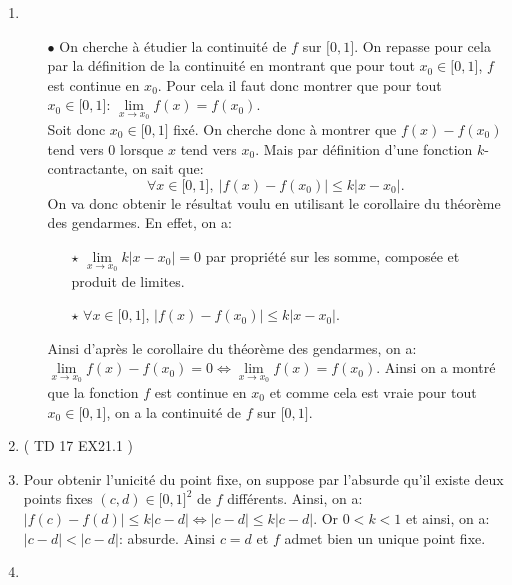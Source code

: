 \documentclass[a4paper, 11pt,reqno]{article}
\begin{document}
\begin{correction}  \;
\begin{enumerate}
\item 
\begin{itemize}
\item[$\bullet$] On cherche \`{a} \'etudier la continuit\'e de $f$ sur $\lbrack 0,1\rbrack$. On repasse pour cela par la d\'efinition de la continuit\'e en montrant que pour tout $x_0\in\lbrack 0,1\rbrack$, $f$ est continue en $x_0$. Pour cela il faut donc montrer que pour tout $x_0\in\lbrack 0,1\rbrack$: $\lim\limits_{x\to x_0} f(x)=f(x_0)$.\\
\noindent Soit donc $x_0\in\lbrack 0,1\rbrack$ fix\'e. On cherche donc \`{a} montrer que $f(x)-f(x_0)$ tend vers 0 lorsque $x$ tend vers $x_0$. Mais par d\'efinition d'une fonction $k$-contractante, on sait que:
$$\forall x\in\lbrack 0,1\rbrack,\ |f(x)-f(x_0)|\leq k|x-x_0|.$$
On va donc obtenir le r\'esultat voulu en utilisant le corollaire du th\'eor\`{e}me des gendarmes. En effet, on a:
\begin{itemize}
\item[$\star$] $\lim\limits_{x\to x_0} k |x-x_0|=0$ par propri\'et\'e sur les somme, compos\'ee et produit de limites.
\item[$\star$] $\forall x\in\lbrack 0,1\rbrack$, $|f(x)-f(x_0)|\leq k |x-x_0|$.
\end{itemize}
Ainsi d'apr\`{e}s le corollaire du th\'eor\`{e}me des gendarmes, on a: $\lim\limits_{x\to x_0} f(x)-f(x_0)=0\Leftrightarrow \lim\limits_{x\to x_0} f(x)=f(x_0)$. Ainsi on a montr\'e que la fonction $f$ est continue en $x_0$ et comme cela est vraie pour tout $x_0\in\lbrack 0,1\rbrack$, on a la continuit\'e de $f$ sur $\lbrack 0,1\rbrack$. 

\end{itemize}
\item ( TD 17 EX21.1 )
\item Pour obtenir l'unicit\'e du point fixe, on suppose par l'absurde qu'il existe deux points fixes $(c,d)\in\lbrack 0,1\rbrack^2$ de $f$ diff\'erents. Ainsi, on a: 
$|f(c)-f(d)|\leq k|c-d|\Leftrightarrow |c-d|\leq k|c-d|$. Or $0<k<1$ et ainsi, on a: $|c-d|<|c-d|$: absurde. Ainsi $c=d$ et $f$ admet bien un unique point fixe.


\item
\begin{enumerate}


\end{enumerate}
\end{enumerate}
\end{correction}
\end{document}
